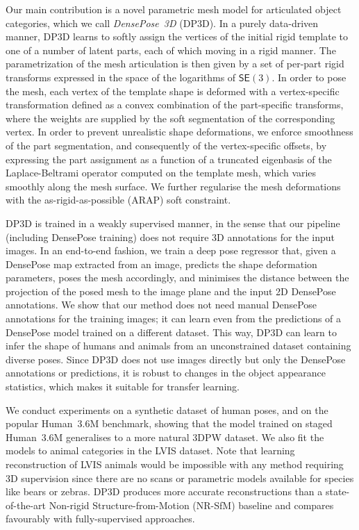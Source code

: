 Our main contribution is a novel parametric mesh model for articulated object categories, which we call \emph{DensePose~3D} (DP3D).
In a purely data-driven manner, DP3D learns to softly assign the vertices of the initial rigid template to one of a number of latent parts, each of which moving in a rigid manner.
The parametrization of the mesh articulation is then given by a set of per-part rigid transforms expressed in the space of the logarithms of $\textsf{SE}(3)$.
In order to pose the mesh, each vertex of the template shape is deformed with a vertex-specific transformation defined as a convex combination of the part-specific transforms, where the weights are supplied by the soft segmentation of the corresponding vertex.
In order to prevent unrealistic shape deformations, we enforce smoothness of the part segmentation, and consequently of the vertex-specific offsets, by expressing the part assignment as a function of a truncated eigenbasis of the Laplace-Beltrami operator computed on the template mesh, which varies smoothly along the mesh surface.
We further regularise the mesh deformations with the as-rigid-as-possible (ARAP) soft constraint.

DP3D is trained in a weakly supervised manner, in the sense that our pipeline (including DensePose training) does not require 3D annotations for the input images.
In an end-to-end fashion, we train a deep pose regressor that, given a DensePose map extracted from an image, predicts the shape deformation parameters, poses the mesh accordingly, and minimises the distance between the projection of the posed mesh to the image plane and the input 2D DensePose annotations.
We show that our method does not need manual DensePose annotations for the training images; it can learn even from the predictions of a DensePose model trained on a different dataset.
This way, DP3D can learn to infer the shape of humans and animals from an unconstrained dataset containing diverse poses.
Since DP3D does not use images directly but only the DensePose annotations or predictions,
it is robust to changes in the object appearance statistics, which makes it suitable for transfer learning.

We conduct experiments on a synthetic dataset of human poses, and on the popular Human~3.6M benchmark, showing that the model trained on staged Human~3.6M generalises to a more natural 3DPW dataset.
We also fit the models to animal categories in the LVIS dataset.
Note that learning reconstruction of LVIS animals would be impossible with any method requiring 3D supervision since there are no scans or parametric models available for species like bears or zebras.
DP3D produces more accurate reconstructions than a state-of-the-art Non-rigid Structure-from-Motion (NR-SfM) baseline and compares favourably with fully-supervised approaches.
